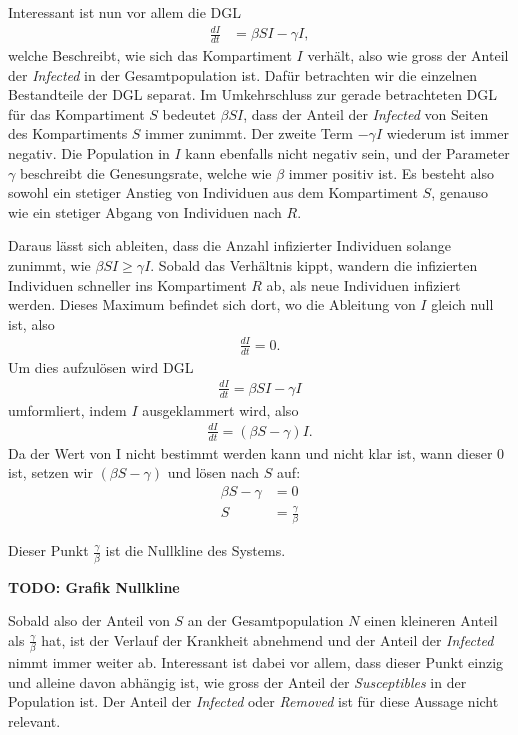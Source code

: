 \begin{refsection}
Interessant ist nun vor allem die DGL
\begin{align*}
  \frac{dI}{dt} & = \beta S I - \gamma I,
\end{align*}
welche Beschreibt, wie sich das Kompartiment $I$ verhält, also wie gross der Anteil der \emph{Infected} in der Gesamtpopulation ist.
Dafür betrachten wir die einzelnen Bestandteile der DGL separat. 
Im Umkehrschluss zur gerade betrachteten DGL für das Kompartiment $S$ bedeutet $\beta S I$, dass der Anteil der \emph{Infected} von Seiten des Kompartiments $S$ immer zunimmt.
Der zweite Term $- \gamma I$ wiederum ist immer negativ. 
Die Population in $I$ kann ebenfalls nicht negativ sein, und der Parameter $\gamma$ beschreibt die Genesungsrate, welche wie $\beta$ immer positiv ist.
Es besteht also sowohl ein stetiger Anstieg von Individuen aus dem Kompartiment $S$, genauso wie ein stetiger Abgang von Individuen nach $R$.

Daraus lässt sich ableiten, dass die Anzahl infizierter Individuen solange zunimmt, wie $\beta S I \ge \gamma I$. Sobald das Verhältnis kippt, wandern die infizierten Individuen schneller ins Kompartiment $R$ ab, als neue Individuen infiziert werden.
Dieses Maximum befindet sich dort, wo die Ableitung von $I$ gleich null ist, also
\begin{align*}
  \frac{dI}{dt} = 0.
\end{align*}
Um dies aufzulösen wird DGL 
\begin{align*}
  \frac{dI}{dt} = \beta S I - \gamma I
\end{align*}
umformliert, indem $I$ ausgeklammert wird, also
\begin{align*}
  \frac{dI}{dt} = \left(\beta S - \gamma \right) I.
\end{align*}
Da der Wert von I nicht bestimmt werden kann und nicht klar ist, wann dieser 0 ist, setzen wir $\left(\beta S - \gamma \right)$ und lösen nach $S$ auf:
\begin{align*}
  \beta S - \gamma &= 0 \\
  S &= \frac{\gamma}{\beta}
\end{align*}

Dieser Punkt $\frac{\gamma}{\beta}$ ist die Nullkline des Systems. 

\textbf{TODO: Grafik Nullkline}

Sobald also der Anteil von $S$ an der Gesamtpopulation $N$ einen kleineren Anteil als $\frac{\gamma}{\beta}$ hat, ist der Verlauf der Krankheit abnehmend und der Anteil der \emph{Infected} nimmt immer weiter ab.
Interessant ist dabei vor allem, dass dieser Punkt einzig und alleine davon abhängig ist, wie gross der Anteil der \emph{Susceptibles} in der Population ist. 
Der Anteil der \emph{Infected} oder \emph{Removed} ist für diese Aussage nicht relevant. 


\end{refsection}
